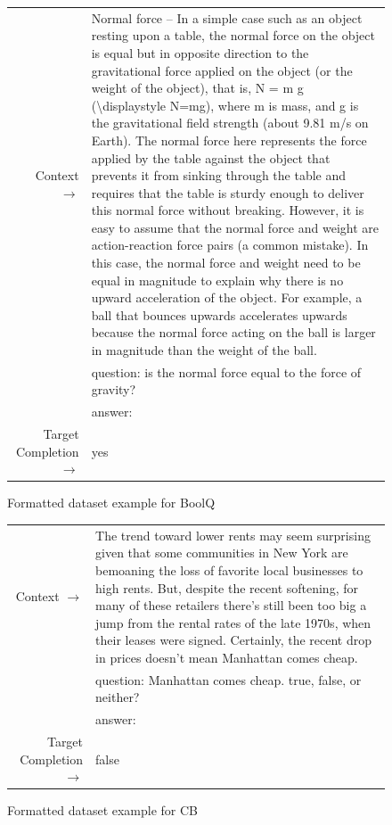\begin{figure} { \tt \footnotesize \begin{tabularx}{\linewidth}{r X} \toprule Context $\to$ & Normal force -- In a simple case such as an object resting upon a table, the normal force on the object is equal but in opposite direction to the gravitational force applied on the object (or the weight of the object), that is, N = m g ({\textbackslash}displaystyle N=mg), where m is mass, and g is the gravitational field strength (about 9.81 m/s on Earth). The normal force here represents the force applied by the table against the object that prevents it from sinking through the table and requires that the table is sturdy enough to deliver this normal force without breaking. However, it is easy to assume that the normal force and weight are action-reaction force pairs (a common mistake). In this case, the normal force and weight need to be equal in magnitude to explain why there is no upward acceleration of the object. For example, a ball that bounces upwards accelerates upwards because the normal force acting on the ball is larger in magnitude than the weight of the ball. \\ 
 & question: is the normal force equal to the force of gravity? \\ 
 & answer: \\ 
 \midrule Target Completion $\to$ & yes\\ \bottomrule \end{tabularx} }  \caption{Formatted dataset example for BoolQ}  \label{eval:BoolQ}  \end{figure}%
\begin{figure} { \tt \footnotesize \begin{tabularx}{\linewidth}{r X} \toprule Context $\to$ & The trend toward lower rents may seem surprising given that some communities in New York are bemoaning the loss of favorite local businesses to high rents. But, despite the recent softening, for many of these retailers there's still been too big a jump from the rental rates of the late 1970s, when their leases were signed. Certainly, the recent drop in prices doesn't mean Manhattan comes cheap. \\ 
 & question: Manhattan comes cheap. true, false, or neither? \\ 
 & answer: \\ 
 \midrule Target Completion $\to$ & false\\ \bottomrule \end{tabularx} }  \caption{Formatted dataset example for CB}  \label{eval:CB}  \end{figure}%
